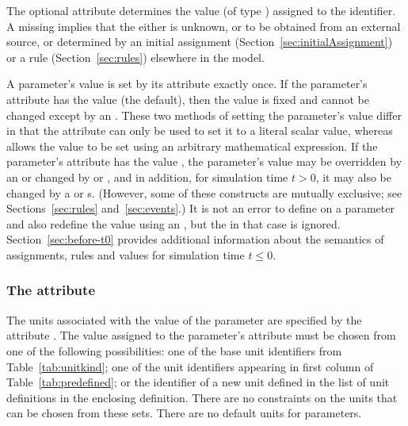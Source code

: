 The optional attribute  determines the value (of type
) assigned to the identifier.  A missing
 implies that the  either is unknown, or
to be obtained from an external source, or determined by an
initial assignment (Section~\ref{sec:initialAssignment}) or a rule
(Section~\ref{sec:rules}) elsewhere in the model.

A parameter's value is set by its  attribute exactly
once.  If the parameter's  attribute has the value
 (the default), then the value is fixed and cannot be
changed except by an \InitialAssignment.  These two methods of
setting the parameter's value differ in that the 
attribute can only be used to set it to a literal scalar value,
whereas \InitialAssignment allows the value to be set using an
arbitrary mathematical expression.  If the parameter's
 attribute has the value , the parameter's
value may be overridden by an \InitialAssignment or changed by
\AssignmentRule or \AlgebraicRule, and in addition, for simulation
time $t > 0$, it may also be changed by a \RateRule or \Event{}s.
(However, some of these constructs are mutually exclusive; see
Sections~\ref{sec:rules} and~\ref{sec:events}.)  It is not an
error to define  on a parameter and also redefine the
value using an \InitialAssignment, but the  in that
case is ignored.  Section~\ref{sec:before-t0} provides additional
information about the semantics of assignments, rules and values
for simulation time $t \leq 0$.


\subsubsection{The  attribute}
\label{sec:parameter-units}

The units associated with the value of the parameter are specified
by the attribute .  The value assigned to
the parameter's  attribute must be chosen
from one of the following possibilities: one of the base unit
identifiers from Table~\vref{tab:unitkind}; one of the 
unit identifiers appearing in first column of
Table~\vref{tab:predefined}; or the identifier of a new unit defined
in the list of unit definitions in the enclosing \Model definition.
There are no constraints on the units that can be chosen from
these sets.  There are no default units for parameters.

